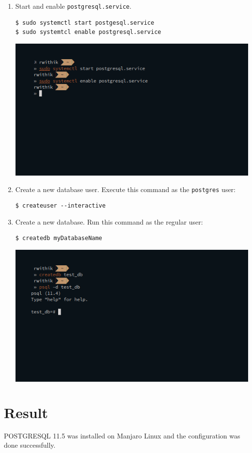 \begin{enumerate}
\item Start and enable \verb-postgresql.service-.
\begin{verbatim}
$ sudo systemctl start postgesql.service
$ sudo systemtcl enable postgresql.service
\end{verbatim}
\includegraphics[width=\linewidth]{../Images/Installation/5.png}\newline
\item Create a new database user. Execute this command as the \verb-postgres- user:
\begin{verbatim}
$ createuser --interactive
\end{verbatim}
\item Create a new database. Run this command as the regular user:
\begin{verbatim}
$ createdb myDatabaseName
\end{verbatim}
\includegraphics[width=\linewidth]{../Images/Installation/6.png}\newline

\end{enumerate}

\section{Result}
POSTGRESQL 11.5 was installed on Manjaro Linux and the configuration was done successfully.